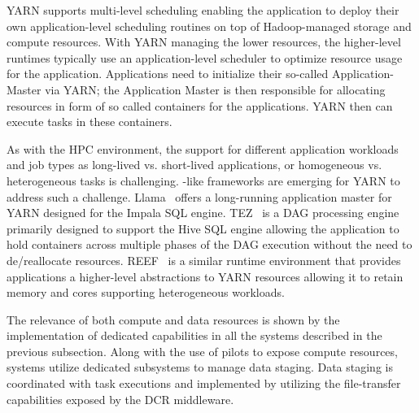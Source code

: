 \documentclass{sig-alternate}
\begin{document}
YARN supports multi-level scheduling enabling the application to deploy their
own application-level scheduling routines on top of Hadoop-managed storage and
compute resources. With YARN managing the lower resources, the higher-level
runtimes typically use an application-level scheduler to optimize resource usage
for the application. Applications need to initialize their so-called
Application-Master via YARN; the Application Master is then responsible for
allocating resources in form of so called containers for the applications. YARN
then can execute tasks in these containers.

As with the HPC environment, the support for different application workloads and
job types as long-lived vs. short-lived applications, or homogeneous vs.
heterogeneous tasks is challenging. \pilot-like frameworks are emerging for YARN
to address such a challenge. Llama~\cite{llama_url} offers a long-running
application master for YARN designed for the Impala SQL engine.
TEZ~\cite{tez_url} is a DAG processing engine primarily designed to support the
Hive SQL engine allowing the application to hold containers across multiple
phases of the DAG execution without the need to de/reallocate resources.
REEF~\cite{chun2013reef} is a similar runtime environment that
provides applications a higher-level abstractions to YARN resources allowing it
to retain memory and cores supporting heterogeneous workloads.

 



The relevance of both compute and data resources is shown by the implementation
of dedicated capabilities in all the \pilot systems described in the previous
subsection. Along with the use of pilots to expose compute resources, \pilot
systems utilize dedicated subsystems to manage data staging. Data staging is
coordinated with task executions and implemented by utilizing the file-transfer
capabilities exposed by the DCR middleware.
\end{document}

